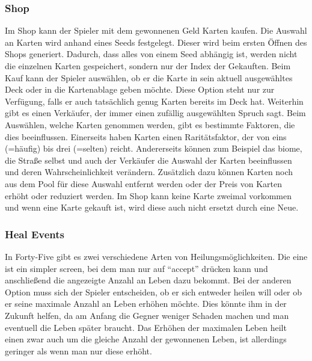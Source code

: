 \subsubsection{Shop}\label{subsubsec:shop}
Im Shop kann der Spieler mit dem gewonnenen Geld Karten kaufen.
Die Auswahl an Karten wird anhand eines Seeds festgelegt.
Dieser wird beim ersten Öffnen des Shops generiert.
Dadurch, dass alles von einem Seed abhängig ist, werden nicht die einzelnen Karten gespeichert, sondern nur der Index der Gekauften.
Beim Kauf kann der Spieler auswählen, ob er die Karte in sein aktuell ausgewähltes Deck oder in die Kartenablage geben möchte.
Diese Option steht nur zur Verfügung, falls er auch tatsächlich genug Karten bereits im Deck hat.
Weiterhin gibt es einen Verkäufer, der immer einen zufällig ausgewählten Spruch sagt.
Beim Auswählen, welche Karten genommen werden, gibt es bestimmte Faktoren, die dies beeinflussen.
Einerseits haben Karten einen Raritätsfaktor, der von eins (=häufig) bis drei (=selten) reicht.
Andererseits können zum Beispiel das biome, die Straße selbst und auch der Verkäufer die Auswahl der Karten beeinflussen und deren Wahrscheinlichkeit verändern.
Zusätzlich dazu können Karten noch aus dem Pool für diese Auswahl entfernt werden oder der Preis von Karten erhöht oder reduziert werden.
Im Shop kann keine Karte zweimal vorkommen und wenn eine Karte gekauft ist, wird diese auch nicht ersetzt durch eine Neue.

\subsubsection{Heal Events}\label{subsubsec:heal-event}
In Forty-Five gibt es zwei verschiedene Arten von Heilungsmöglichkeiten.
Die eine ist ein simpler screen, bei dem man nur auf ``accept'' drücken kann und anschließend die angezeigte Anzahl an Leben dazu bekommt.
Bei der anderen Option muss sich der Spieler entscheiden, ob er sich entweder heilen will oder ob er seine maximale Anzahl an Leben erhöhen möchte.
Dies könnte ihm in der Zukunft helfen, da am Anfang die Gegner weniger Schaden machen und man eventuell die Leben später braucht.
Das Erhöhen der maximalen Leben heilt einen zwar auch um die gleiche Anzahl der gewonnenen Leben, ist allerdings geringer als wenn man nur diese erhöht.

